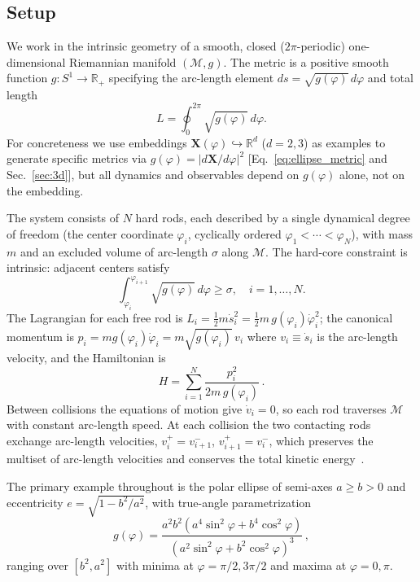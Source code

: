 \documentclass[aps,pre,twocolumn,superscriptaddress,longbibliography,floatfix]{revtex4-2}
\begin{document}
\subsection{Setup}

We work in the intrinsic geometry of a smooth, closed
($2\pi$-periodic) one-dimensional Riemannian manifold $(\mathcal{M},g)$.
The metric is a positive smooth function $g:S^1\to\mathbb{R}_+$ specifying the arc-length
element $ds=\sqrt{g(\varphi)}\,d\varphi$ and total length
\begin{equation}
  L = \oint_0^{2\pi}\!\sqrt{g(\varphi)}\,d\varphi.
  \label{eq:metric}
\end{equation}
For concreteness we use embeddings $\bm{X}(\varphi)\hookrightarrow\mathbb{R}^d$ ($d=2,3$) as
examples to generate specific metrics via $g(\varphi)=|d\bm{X}/d\varphi|^2$
[Eq.~\eqref{eq:ellipse_metric} and Sec.~\ref{sec:3d}], but all dynamics and observables
depend on $g(\varphi)$ alone, not on the embedding.

The system consists of $N$ hard rods, each described by a single dynamical degree of
freedom (the center coordinate $\varphi_i$, cyclically ordered
$\varphi_1<\cdots<\varphi_N$), with mass $m$ and an excluded volume of arc-length $\sigma$
along $\mathcal{M}$.
The hard-core constraint is intrinsic: adjacent centers satisfy
\begin{equation}
  \int_{\varphi_i}^{\varphi_{i+1}}\!\sqrt{g(\varphi)}\,d\varphi \geq \sigma, \quad i=1,\dots,N.
  \label{eq:hardcore}
\end{equation}
The Lagrangian for each free rod is $L_i=\tfrac{1}{2}m\dot s_i^2=\tfrac{1}{2}m\,g(\varphi_i)\dot\varphi_i^2$;
the canonical momentum is $p_i=mg(\varphi_i)\dot\varphi_i=m\sqrt{g(\varphi_i)}\,v_i$ where
$v_i\equiv\dot s_i$ is the arc-length velocity, and the Hamiltonian is
\begin{equation}
  H = \sum_{i=1}^N \frac{p_i^2}{2m\,g(\varphi_i)}\,.
  \label{eq:hamiltonian}
\end{equation}
Between collisions the equations of motion give $\dot v_i=0$, so each rod traverses
$\mathcal{M}$ with constant arc-length speed.
At each collision the two contacting rods exchange arc-length velocities,
$v_i^+=v_{i+1}^-$, $v_{i+1}^+=v_i^-$, which preserves the multiset of arc-length velocities
and conserves the total kinetic energy~\cite{CoxFeresWard2015}.

The primary example throughout is the polar ellipse of semi-axes $a\geq b>0$ and eccentricity
$e=\sqrt{1-b^2/a^2}$, with true-angle parametrization
\begin{equation}
  g(\varphi) = \frac{a^2b^2(a^4\sin^2\!\varphi+b^4\cos^2\!\varphi)}{(a^2\sin^2\!\varphi+b^2\cos^2\!\varphi)^3}\,,
  \label{eq:ellipse_metric}
\end{equation}
ranging over $[b^2,a^2]$ with minima at $\varphi=\pi/2,3\pi/2$ and maxima at $\varphi=0,\pi$.
\end{document}
